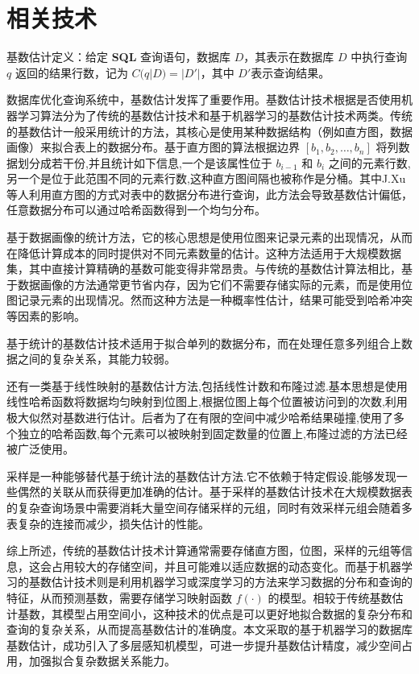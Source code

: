 \section{相关技术}
    \fontsize{10.5pt}{12.6pt}\selectfont
    \songti
    \par 基数估计定义：给定 \textbf{SQL} 查询语句，数据库 $D$，其表示在数据库 $D$ 中执行查询 $q$ 返回的结果行数，记为 $C(q|D)=|D'|$，其中 $D'$表示查询结果。
    \par 数据库优化查询系统中，基数估计发挥了重要作用。基数估计技术根据是否使用机器学习算法分为了传统的基数估计技术和基于机器学习的基数估计技术两类。传统的基数估计一般采用统计的方法，其核心是使用某种数据结构（例如直方图，数据画像）来拟合表上的数据分布。基于直方图的算法\cite{ref3}根据边界 $[b_1, b_2, \dots, b_n]$ 将列数据划分成若干份,并且统计如下信息,一个是该属性位于 $b_{i-1}$ 和 $b_i$ 之间的元素行数,另一个是位于此范围不同的元素行数,这种直方图间隔也被称作是分桶。其中J.Xu\cite{ref4} 等人利用直方图的方式对表中的数据分布进行查询，此方法会导致基数估计偏低，任意数据分布可以通过哈希函数得到一个均匀分布。
    \par 基于数据画像的统计方法，它的核心思想是使用位图来记录元素的出现情况，从而在降低计算成本的同时提供对不同元素数量的估计。这种方法适用于大规模数据集，其中直接计算精确的基数可能变得非常昂贵。与传统的基数估计算法相比，基于数据画像的方法通常更节省内存，因为它们不需要存储实际的元素，而是使用位图记录元素的出现情况。然而这种方法是一种概率性估计，结果可能受到哈希冲突等因素的影响\cite{ref2}。
    \par 基于统计的基数估计技术适用于拟合单列的数据分布，而在处理任意多列组合上数据之间的复杂关系，其能力较弱\cite{ref1}。
    \par 还有一类基于线性映射的基数估计方法,包括线性计数\cite{ref6}和布隆过滤\cite{ref7}.基本思想是使用线性哈希函数将数据均匀映射到位图上,根据位图上每个位置被访问到的次数,利用极大似然对基数进行估计。后者为了在有限的空间中减少哈希结果碰撞,使用了多个独立的哈希函数,每个元素可以被映射到固定数量的位置上,布隆过滤的方法已经被广泛使用\cite{ref2}。
    \par 采样是一种能够替代基于统计法的基数估计方法.它不依赖于特定假设,能够发现一些偶然的关联从而获得更加准确的估计\cite{ref2}。基于采样的基数估计技术在大规模数据表的复杂查询场景中需要消耗大量空间存储采样的元组，同时有效采样元组会随着多表复杂的连接而减少，损失估计的性能。
    \par 综上所述，传统的基数估计技术计算通常需要存储直方图，位图，采样的元组等信息，这会占用较大的存储空间，并且可能难以适应数据的动态变化。而基于机器学习的基数估计技术则是利用机器学习或深度学习的方法来学习数据的分布和查询的特征，从而预测基数，需要存储学习映射函数 $f(\cdot)$ 的模型\cite{ref1}。相较于传统基数估计基数，其模型占用空间小，这种技术的优点是可以更好地拟合数据的复杂分布和查询的复杂关系，从而提高基数估计的准确度。本文采取的基于机器学习的数据库基数估计，成功引入了多层感知机模型，可进一步提升基数估计精度，减少空间占用，加强拟合复杂数据关系能力。
    \vfill
